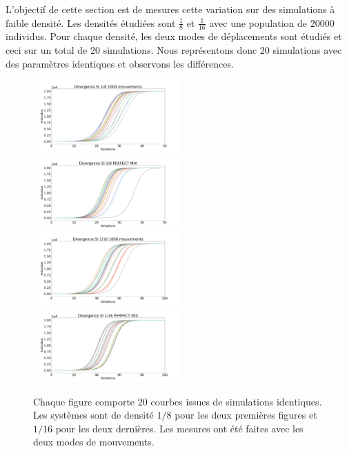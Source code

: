 L'objectif de cette section est de mesures cette variation sur des simulations à faible densité. Les densités étudiées sont $\frac{1}{8}$ et $\frac{1}{16}$ avec une population de $20000$ individus. Pour chaque densité, les deux modes de déplacements sont étudiés et ceci sur un total de $20$ simulations. Nous représentons donc $20$ simulations avec des paramètres identiques et observons les différences.

\newpage

\begin{figure}
    \centering
    \captionsetup{justification=centering}
    \includegraphics[width=0.5\textwidth]{Images/SI_divergence_8_1000.pdf}
    \includegraphics[width=0.5\textwidth]{Images/SI_divergence_8_mix.pdf}
    \includegraphics[width=0.5\textwidth]{Images/SI_divergence_16_1000.pdf}
    \includegraphics[width=0.5\textwidth]{Images/SI_divergence_16_mix.pdf}
    \caption[Variations aléatoires : SI]{Chaque figure comporte $20$ courbes issues de simulations identiques. Les systèmes sont de densité $1/8$ pour les deux premières figures et $1/16$ pour les deux dernières. Les mesures ont été faites avec les deux modes de mouvements.}
\end{figure}

